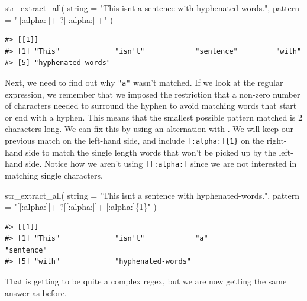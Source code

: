 \documentclass[
]{krantz}
\makeatletter
\newenvironment{Shaded}{\begin{snugshade}}{\end{snugshade}}
\newcommand{\AttributeTok}[1]{\textcolor[rgb]{0.77,0.63,0.00}{#1}}
\newcommand{\FunctionTok}[1]{\textcolor[rgb]{0.00,0.00,0.00}{#1}}
\newcommand{\NormalTok}[1]{#1}
\newcommand{\StringTok}[1]{\textcolor[rgb]{0.31,0.60,0.02}{#1}}
\newenvironment{kframe}{%
\medskip{}
\setlength{\fboxsep}{.8em}
 \def\at@end@of@kframe{}%
 \ifinner\ifhmode%
  \def\at@end@of@kframe{\end{minipage}}%
  \begin{minipage}{\columnwidth}%
 \fi\fi%
 \def\FrameCommand##1{\hskip\@totalleftmargin \hskip-\fboxsep
 \colorbox{shadecolor}{##1}\hskip-\fboxsep
     \hskip-\linewidth \hskip-\@totalleftmargin \hskip\columnwidth}%
 \MakeFramed {\advance\hsize-\width
   \@totalleftmargin\z@ \linewidth\hsize
   \@setminipage}}%
 {\par\unskip\endMakeFramed%
 \at@end@of@kframe}
\renewenvironment{Shaded}{\begin{kframe}}{\end{kframe}}
\makeatother
\begin{document}
\begin{Shaded}
\begin{Highlighting}[]
\FunctionTok{str\_extract\_all}\NormalTok{(}
  \AttributeTok{string =} \StringTok{"This isn\textquotesingle{}t a sentence with hyphenated{-}words."}\NormalTok{,}
  \AttributeTok{pattern =} \StringTok{"[[:alpha:]\textquotesingle{}]+{-}?[[:alpha:]\textquotesingle{}]+"}
\NormalTok{)}
\end{Highlighting}
\end{Shaded}

\begin{verbatim}
#> [[1]]
#> [1] "This"             "isn't"            "sentence"         "with"            
#> [5] "hyphenated-words"
\end{verbatim}

Next, we need to find out why \texttt{"a"} wasn't matched. If we look at the regular expression, we remember that we imposed the restriction that a non-zero number of characters needed to surround the hyphen to avoid matching words that start or end with a hyphen. This means that the smallest possible pattern matched is 2 characters long. We can fix this by using an alternation with \texttt{\textbar{}}. We will keep our previous match on the left-hand side, and include \texttt{{[}:alpha:{]}\{1\}} on the right-hand side to match the single length words that won't be picked up by the left-hand side. Notice how we aren't using \texttt{{[}{[}:alpha:{]}\textquotesingle{}{]}} since we are not interested in matching single \texttt{\textquotesingle{}} characters.

\begin{Shaded}
\begin{Highlighting}[]
\FunctionTok{str\_extract\_all}\NormalTok{(}
  \AttributeTok{string =} \StringTok{"This isn\textquotesingle{}t a sentence with hyphenated{-}words."}\NormalTok{,}
  \AttributeTok{pattern =} \StringTok{"[[:alpha:]\textquotesingle{}]+{-}?[[:alpha:]\textquotesingle{}]+|[:alpha:]\{1\}"}
\NormalTok{)}
\end{Highlighting}
\end{Shaded}

\begin{verbatim}
#> [[1]]
#> [1] "This"             "isn't"            "a"                "sentence"        
#> [5] "with"             "hyphenated-words"
\end{verbatim}

That is getting to be quite a complex regex, but we are now getting the same answer as before.
\end{document}
